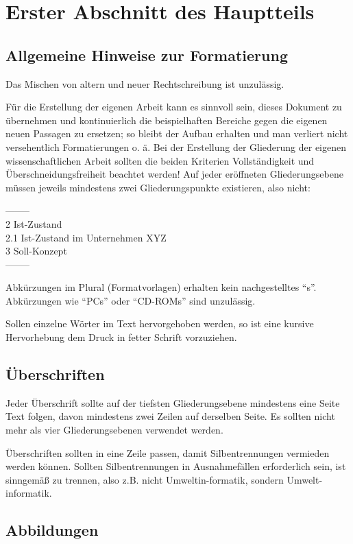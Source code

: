 \documentclass[11pt]{scrartcl}
\begin{document}
\section{Erster Abschnitt des Hauptteils}
\subsection{Allgemeine Hinweise zur Formatierung}
Das Mischen von altern und neuer Rechtschreibung ist unzulässig. 

Für die Erstellung der eigenen Arbeit kann es sinnvoll sein, dieses Dokument zu übernehmen  und kontinuierlich die beispielhaften Bereiche gegen die eigenen neuen Passagen zu ersetzen; so bleibt der Aufbau erhalten und man verliert nicht versehentlich Formatierungen o. ä. Bei der Erstellung der Gliederung der eigenen wissenschaftlichen Arbeit sollten die beiden Kriterien Vollständigkeit und Überschneidungsfreiheit beachtet werden! Auf jeder eröffneten Gliederungsebene müssen jeweils mindestens zwei Gliederungspunkte existieren, also nicht:

\noindent--------\\
2	Ist-Zustand\\
2.1	Ist-Zustand im Unternehmen XYZ\\
3	Soll-Konzept\\
--------

Abkürzungen im Plural (Formatvorlagen) erhalten kein nachgestelltes "`s"'. Abkürzungen wie "`PCs"' oder "`CD-ROMs"' sind unzulässig.

Sollen einzelne Wörter im Text hervorgehoben werden, so ist eine kursive Hervorhebung dem Druck in fetter Schrift  vorzuziehen.

\subsection{Überschriften}

Jeder Überschrift sollte auf der tiefsten Gliederungsebene mindestens eine Seite Text folgen, davon mindestens zwei Zeilen auf derselben Seite. Es sollten nicht mehr als vier Gliederungsebenen verwendet werden. 

Überschriften sollten in eine Zeile passen, damit Silbentrennungen vermieden werden können. Sollten Silbentrennungen in Ausnahmefällen erforderlich sein, ist sinngemäß zu trennen, also z.B. nicht Umweltin-formatik, sondern Umwelt-informatik.

\subsection{Abbildungen}
\end{document}
